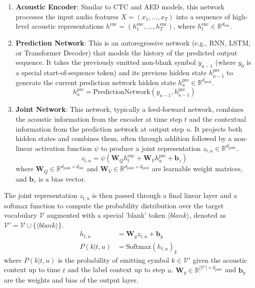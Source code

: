 \begin{enumerate}
    \item \textbf{Acoustic Encoder}: Similar to CTC and AED models, this network processes the input audio features $X = (x_1, \dots, x_T)$ into a sequence of high-level acoustic representations $h^{\text{enc}} = (h^{\text{enc}}_1, \dots, h^{\text{enc}}_T)$, where $h^{\text{enc}}_t \in \mathbb{R}^{d_{\text{enc}}}$.

    \item \textbf{Prediction Network}: This is an autoregressive network (e.g., RNN, LSTM, or Transformer Decoder) that models the history of the predicted output sequence. It takes the previously emitted non-blank symbol $y_{u-1}$ (where $y_0$ is a special start-of-sequence token) and its previous hidden state $h^{\text{pre}}_{u-1}$ to generate the current prediction network hidden state $h^{\text{pre}}_u \in \mathbb{R}^{d_{\text{pred}}}$.
    \begin{equation}
        h^{\text{pre}}_u = \text{PredictionNetwork}(y_{u-1}, h^{\text{pre}}_{u-1})
    \end{equation}

    \item \textbf{Joint Network}: This network, typically a feed-forward network, combines the acoustic information from the encoder at time step $t$ and the contextual information from the prediction network at output step $u$. It projects both hidden states and combines them, often through addition followed by a non-linear activation function $\psi$ to produce a joint representation $z_{t,u} \in \mathbb{R}^{d_{\text{joint}}}$.
    \begin{equation} \label{eq:rnnt_joint}
        z_{t,u} = \psi(\mathbf{W}_Q h^{\text{enc}}_t + \mathbf{W}_V h^{\text{pre}}_u + \mathbf{b}_z)
    \end{equation}
    where $\mathbf{W}_Q \in \mathbb{R}^{d_{\text{joint}} \times d_{\text{enc}}}$ and $\mathbf{W}_V \in \mathbb{R}^{d_{\text{joint}} \times d_{\text{pred}}}$ are learnable weight matrices, and $\mathbf{b}_z$ is a bias vector.
\end{enumerate}

The joint representation $z_{t,u}$ is then passed through a final linear layer and a softmax function to compute the probability distribution over the target vocabulary $\mathcal{V}$ augmented with a special 'blank' token $\langle blank \rangle$, denoted as $\mathcal{V}' = \mathcal{V} \cup \{\langle blank \rangle\}$.
\begin{align}
    h_{t,u} &= \mathbf{W}_y z_{t,u} + \mathbf{b}_y \label{eq:rnnt_linear_output} \\
    P(k | t, u) &= \text{Softmax}(h_{t,u})_k  \label{eq:rnnt_softmax}
\end{align}
where $P(k | t, u)$ is the probability of emitting symbol $k \in \mathcal{V}'$ given the acoustic context up to time $t$ and the label context up to step $u$. $\mathbf{W}_y \in \mathbb{R}^{|\mathcal{V}'| \times d_{\text{joint}}}$ and $\mathbf{b}_y$ are the weights and bias of the output layer.

